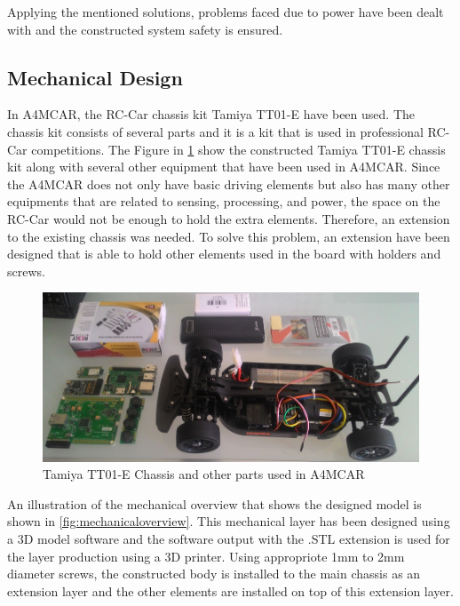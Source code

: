 Applying the mentioned solutions, problems faced due to power have been dealt with and the constructed system safety is ensured.

\subsection{Mechanical Design}
In A4MCAR, the RC-Car chassis kit Tamiya TT01-E \cite{tt01e} have been used. The chassis kit consists of several parts and it is a kit that is used in professional RC-Car competitions. The Figure in \ref{fig:rccarparts} show the constructed Tamiya TT01-E chassis kit along with several other equipment that have been used in A4MCAR. Since the A4MCAR does not only have basic driving elements but also has many other equipments that are related to sensing, processing, and power, the space on the RC-Car would not be enough to hold the extra elements. Therefore, an extension to the existing chassis was needed. To solve this problem, an extension have been designed that is able to hold other elements used in the board with holders and screws. 
\begin{figure}[!ht]
	\centering
	\captionsetup{justification=centering}
	\includegraphics[width=\textwidth]{content/images/rccarparts.png}
	\caption{Tamiya TT01-E Chassis and other parts used in A4MCAR}
	\label{fig:rccarparts}
\end{figure}

An illustration of the mechanical overview that shows the designed model is shown in \ref{fig:mechanicaloverview}. This mechanical layer has been designed using a 3D model software and the software output with the .STL extension is used for the layer production using a 3D printer. Using appropriote 1mm to 2mm diameter screws, the constructed body is installed to the main chassis as an extension layer and the other elements are installed on top of this extension layer. 

